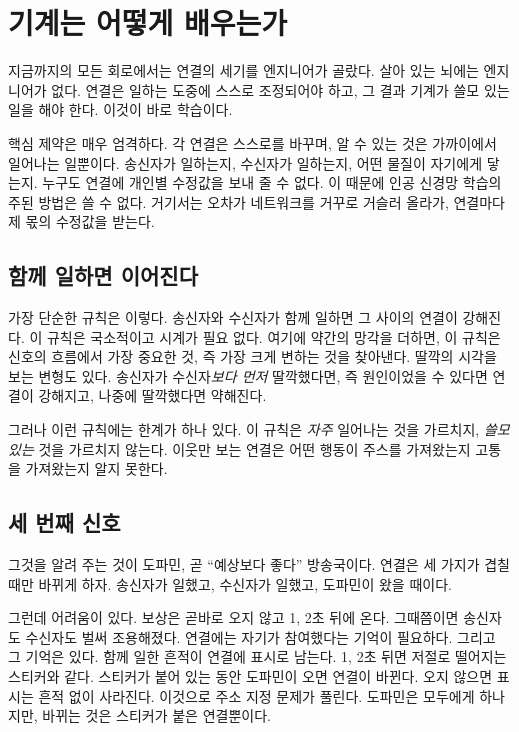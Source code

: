 \chapter{기계는 어떻게 배우는가}

지금까지의 모든 회로에서는 연결의 세기를 엔지니어가 골랐다. 살아 있는 뇌에는 엔지니어가 없다. 연결은 일하는 도중에 스스로 조정되어야 하고, 그 결과 기계가 쓸모 있는 일을 해야 한다. 이것이 바로 학습이다.

핵심 제약은 매우 엄격하다. 각 연결은 스스로를 바꾸며, 알 수 있는 것은 가까이에서 일어나는 일뿐이다. 송신자가 일하는지, 수신자가 일하는지, 어떤 물질이 자기에게 닿는지. 누구도 연결에 개인별 수정값을 보내 줄 수 없다. 이 때문에 인공 신경망 학습의 주된 방법은 쓸 수 없다. 거기서는 오차가 네트워크를 거꾸로 거슬러 올라가, 연결마다 제 몫의 수정값을 받는다.

\section*{함께 일하면 이어진다}

가장 단순한 규칙은 이렇다. 송신자와 수신자가 함께 일하면 그 사이의 연결이 강해진다. 이 규칙은 국소적이고 시계가 필요 없다. 여기에 약간의 망각을 더하면, 이 규칙은 신호의 흐름에서 가장 중요한 것, 즉 가장 크게 변하는 것을 찾아낸다. 딸깍의 시각을 보는 변형도 있다. 송신자가 수신자\emph{보다 먼저} 딸깍했다면, 즉 원인이었을 수 있다면 연결이 강해지고, 나중에 딸깍했다면 약해진다.

그러나 이런 규칙에는 한계가 하나 있다. 이 규칙은 \emph{자주} 일어나는 것을 가르치지, \emph{쓸모 있는} 것을 가르치지 않는다. 이웃만 보는 연결은 어떤 행동이 주스를 가져왔는지 고통을 가져왔는지 알지 못한다.

\section*{세 번째 신호}

그것을 알려 주는 것이 도파민, 곧 “예상보다 좋다” 방송국이다. 연결은 세 가지가 겹칠 때만 바뀌게 하자. 송신자가 일했고, 수신자가 일했고, 도파민이 왔을 때이다.


그런데 어려움이 있다. 보상은 곧바로 오지 않고 1, 2초 뒤에 온다. 그때쯤이면 송신자도 수신자도 벌써 조용해졌다. 연결에는 자기가 참여했다는 기억이 필요하다. 그리고 그 기억은 있다. 함께 일한 흔적이 연결에 표시로 남는다. 1, 2초 뒤면 저절로 떨어지는 스티커와 같다. 스티커가 붙어 있는 동안 도파민이 오면 연결이 바뀐다. 오지 않으면 표시는 흔적 없이 사라진다. 이것으로 주소 지정 문제가 풀린다. 도파민은 모두에게 하나지만, 바뀌는 것은 스티커가 붙은 연결뿐이다.

